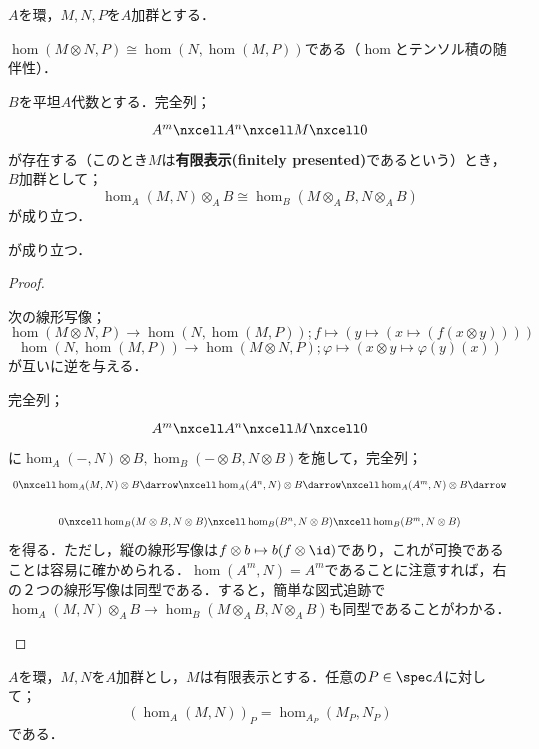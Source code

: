 \begin{lem}\label{lem:Homと平坦代数のテンソル}
	$A$を環，$M,N,P$を$A$加群とする．
	\begin{sakura}
		\item $\hom(M\otimes N,P)\cong\hom(N,\hom(M,P))$である（$\hom$とテンソル積の随伴性）．
		\item $B$を平坦$A$代数とする．完全列；
		\[\begin{tikzcd}
		A^m\nxcell A^n\nxcell M\nxcell 0
		\end{tikzcd}\]
		が存在する（このとき$M$は\textbf{有限表示(finitely presented)}であるという）とき，$B$加群として；
		\[\hom_A(M,N)\otimes_A B\cong \hom_B(M\otimes_A B,N\otimes_A B)\]
		が成り立つ．
	\end{sakura}
	が成り立つ．
\end{lem}

\begin{proof}
	\begin{sakura}
		\item 次の線形写像；
		\[\hom(M\otimes N,P)\to\hom(N,\hom(M,P));f\mapsto (y\mapsto(x\mapsto(f(x\otimes y))))\]
		\[\hom(N,\hom(M,P))\to\hom(M\otimes N,P);\varphi\mapsto (x\otimes y\mapsto\varphi(y)(x))\]
		が互いに逆を与える．
		\item 完全列；
		\[\begin{tikzcd}
		A^m\nxcell A^n\nxcell M\nxcell 0
		\end{tikzcd}\]
		に$\hom_A(-,N)\otimes B,\hom_B(-\otimes B,N\otimes B)$を施して，完全列；
		\[\begin{tikzcd}
			0\nxcell\hom_A(M,N)\otimes B\darrow\nxcell\hom_A(A^n,N)\otimes B\darrow\nxcell\hom_A(A^m,N)\otimes B\darrow\\
			0\nxcell\hom_B(M\otimes B,N\otimes B)\nxcell\hom_B(B^n,N\otimes B)\nxcell\hom_B(B^m,N\otimes B)
		\end{tikzcd}\]
		を得る．ただし，縦の線形写像は$f\otimes b\mapsto b(f\otimes\id)$であり，これが可換であることは容易に確かめられる．$\hom(A^m,N)=A^m$であることに注意すれば，右の２つの線形写像は同型である．すると，簡単な図式追跡で$\hom_A(M,N)\otimes_A B\to\hom_B(M\otimes_A B,N\otimes_A B)$も同型であることがわかる．
	\end{sakura}
\end{proof}

\begin{cor}\label{cor:有限表示なら局所化とhomは可換}
	$A$を環，$M,N$を$A$加群とし，$M$は有限表示とする．任意の$P\in\spec A$に対して；
	\[(\hom_A(M,N))_P=\hom_{A_P}(M_P,N_P)\]
	である．
\end{cor}

